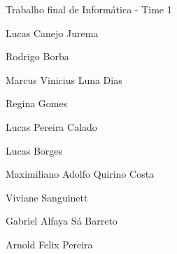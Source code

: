 Trabalho final de Informática -\/ Time 1

Lucas Canejo Jurema

Rodrigo Borba

Marcus Vinicius Luna Dias

Regina Gomes

Lucas Pereira Calado

Lucas Borges

Maximiliano Adolfo Quirino Costa

Viviane Sanguinett

Gabriel Alfaya Sá Barreto

Arnold Felix Pereira 